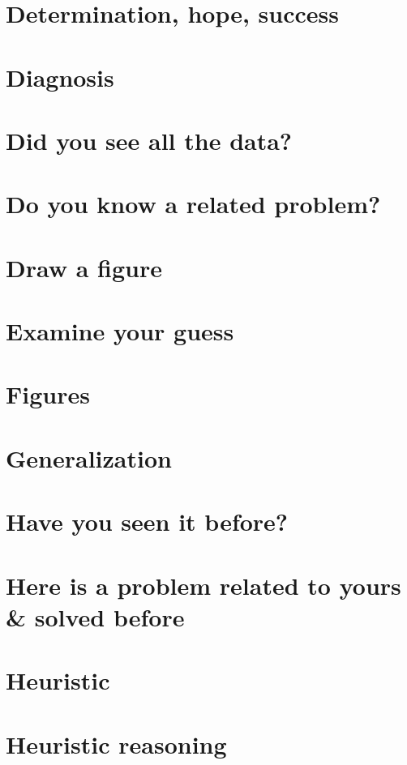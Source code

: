 \documentclass[oneside]{book}
\numberwithin{equation}{section}
\begin{document}
\section{Determination, hope, success}

\section{Diagnosis}

\section{Did you see all the data?}

\section{Do you know a related problem?}

\section{Draw a figure}

\section{Examine your guess}

\section{Figures}

\section{Generalization}

\section{Have you seen it before?}

\section{Here is a problem related to yours \& solved before}

\section{Heuristic}

\section{Heuristic reasoning}
\end{document}
